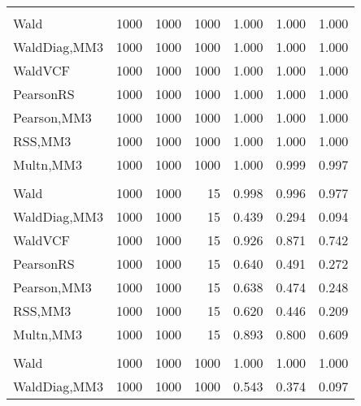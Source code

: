 \documentclass[
]{article}
\begin{document}
\begin{table}[H]
{\begin{tabular}[t]{lrrrrrr}
\addlinespace[0.3em]
\multicolumn{7}{l}{\textbf{1F 15V}}\\
\hspace{1em}Wald & 1000 & 1000 & 1000 & 1.000 & 1.000 & \vphantom{1} 1.000\\
\hspace{1em}WaldDiag,MM3 & 1000 & 1000 & 1000 & 1.000 & 1.000 & 1.000\\
\hspace{1em}WaldVCF & 1000 & 1000 & 1000 & 1.000 & 1.000 & \vphantom{1} 1.000\\
\hspace{1em}PearsonRS & 1000 & 1000 & 1000 & 1.000 & 1.000 & 1.000\\
\hspace{1em}Pearson,MM3 & 1000 & 1000 & 1000 & 1.000 & 1.000 & 1.000\\
\hspace{1em}RSS,MM3 & 1000 & 1000 & 1000 & 1.000 & 1.000 & 1.000\\
\hspace{1em}Multn,MM3 & 1000 & 1000 & 1000 & 1.000 & 0.999 & 0.997\\
\addlinespace[0.3em]
\multicolumn{7}{l}{\textbf{2F 10V}}\\
\hspace{1em}Wald & 1000 & 1000 & 15 & 0.998 & 0.996 & 0.977\\
\hspace{1em}WaldDiag,MM3 & 1000 & 1000 & 15 & 0.439 & 0.294 & 0.094\\
\hspace{1em}WaldVCF & 1000 & 1000 & 15 & 0.926 & 0.871 & 0.742\\
\hspace{1em}PearsonRS & 1000 & 1000 & 15 & 0.640 & 0.491 & 0.272\\
\hspace{1em}Pearson,MM3 & 1000 & 1000 & 15 & 0.638 & 0.474 & 0.248\\
\hspace{1em}RSS,MM3 & 1000 & 1000 & 15 & 0.620 & 0.446 & 0.209\\
\hspace{1em}Multn,MM3 & 1000 & 1000 & 15 & 0.893 & 0.800 & 0.609\\
\addlinespace[0.3em]
\multicolumn{7}{l}{\textbf{3F 15V}}\\
\hspace{1em}Wald & 1000 & 1000 & 1000 & 1.000 & 1.000 & 1.000\\
\hspace{1em}WaldDiag,MM3 & 1000 & 1000 & 1000 & 0.543 & 0.374 & 0.097\\

\end{tabular}}
\end{table}
\end{document}
